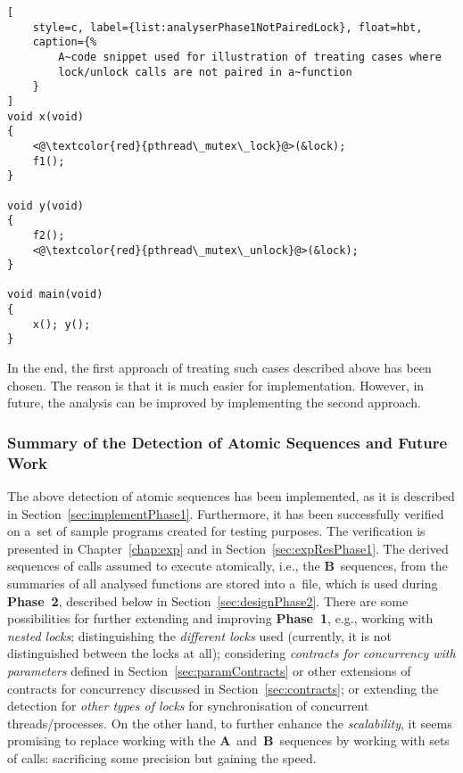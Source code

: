 \begin{lstlisting}[
    style=c, label={list:analyserPhase1NotPairedLock}, float=hbt,
    caption={%
        A~code snippet used for illustration of treating cases where
        lock/unlock calls are not paired in a~function
    }
]
void x(void)
{
    <@\textcolor{red}{pthread\_mutex\_lock}@>(&lock);
    f1();
}

void y(void)
{
    f2();
    <@\textcolor{red}{pthread\_mutex\_unlock}@>(&lock);
}

void main(void)
{
    x(); y();
}
\end{lstlisting}

In the end, the first approach of treating such cases described above has
been chosen. The reason is that it is much easier for implementation.
However, in future, the analysis can be improved by implementing the second
approach.

\newpage
\subsubsection{%
    Summary of the Detection of Atomic Sequences and Future Work
}

The above detection of atomic sequences has been implemented, as it is
described in Section~\ref{sec:implementPhase1}. Furthermore, it has
been successfully verified on a~set of sample programs created for
testing purposes. The verification is presented in Chapter~\ref{chap:exp} and
in Section~\ref{sec:expResPhase1}. The derived sequences of calls assumed to
execute atomically, i.e., the \textbf{B}~sequences, from the summaries
of all analysed functions are stored into a~file, which is used during
\textbf{Phase~2}, described below in Section~\ref{sec:designPhase2}.
There are some possibilities for further extending and improving
\textbf{Phase~1}, e.g., working with \emph{nested locks}; distinguishing
the \emph{different locks} used (currently, it is not distinguished
between the locks at all); considering \emph{contracts for concurrency with
parameters} defined in Section~\ref{sec:paramContracts} or other extensions
of contracts for concurrency discussed in Section~\ref{sec:contracts}; or
extending the detection for \emph{other types of locks} for synchronisation
of concurrent threads/processes. On the other hand, to further enhance the
\emph{scalability}, it seems promising to replace working with the
\textbf{A}~and~\textbf{B}~sequences by working with sets of calls: sacrificing
some precision but gaining the speed.


\newpage
